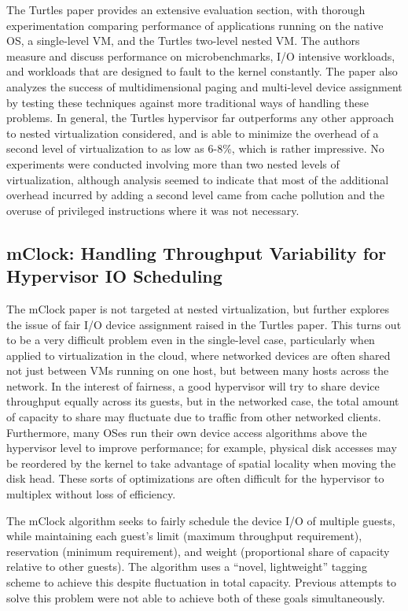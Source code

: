 \documentclass[letterpaper, twocolumn]{article}
\begin{document}
The Turtles paper provides an extensive evaluation section, with thorough experimentation
comparing performance of applications running on the native OS, a single-level VM, and the
Turtles two-level nested VM.  The authors measure and discuss performance on microbenchmarks,
I/O intensive workloads, and workloads that are designed to fault to the kernel constantly.
The paper also analyzes the success of multidimensional paging and multi-level device
assignment by testing these techniques against more traditional ways of handling these
problems.  In general, the Turtles hypervisor far outperforms any other approach to
nested virtualization considered, and is able to minimize the overhead of a second
level of virtualization to as low as 6-8\%, which is rather impressive.  No experiments
were conducted involving more than two nested levels of virtualization, although analysis
seemed to indicate that most of the additional overhead incurred by adding a second level
came from cache pollution and the overuse of privileged instructions where it was not
necessary.

\subsection{mClock: Handling Throughput Variability for Hypervisor IO Scheduling}
\label{sec:summaries/mclock}

The mClock paper \cite{ref:mclock} is not targeted at nested virtualization,
but further explores
the issue of fair I/O device assignment raised in the Turtles paper.  This turns
out to be a very difficult problem even in the single-level case, particularly
when applied to virtualization in the cloud, where networked devices are
often shared not just between VMs running on one host, but between many hosts
across the network.  In the interest of fairness, a good hypervisor will try to
share device throughput equally across its guests, but in the networked case, the
total amount of capacity to share may fluctuate due to traffic from other
networked clients.  Furthermore, many OSes run their own device access algorithms
above the hypervisor level to improve performance; for example, physical disk
accesses may be reordered by the kernel to take advantage of spatial locality
when moving the disk head.  These sorts of optimizations are often difficult
for the hypervisor to multiplex without loss of efficiency.

The mClock algorithm seeks to fairly schedule the device I/O of multiple guests,
while maintaining each guest's limit (maximum throughput requirement), reservation
(minimum requirement), and weight (proportional share of capacity relative to
other guests).  The algorithm uses a ``novel, lightweight'' tagging scheme to
achieve this despite fluctuation in total capacity.  Previous attempts to solve
this problem were not able to achieve both of these goals simultaneously.
\end{document}
